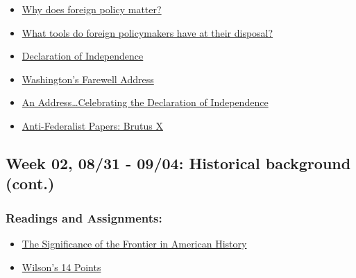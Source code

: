 \documentclass[
  letterpaper,
  DIV=11,
  numbers=noendperiod]{scrartcl}
\providecommand{\tightlist}{%
  \setlength{\itemsep}{0pt}\setlength{\parskip}{0pt}}
\begin{document}
\begin{itemize}
\tightlist
\item
  \href{https://education.cfr.org/learn/video/why-does-us-foreign-policy-matter}{Why
  does foreign policy matter?}
\item
  \href{https://education.cfr.org/learn/learning-journey/tools-foreign-policy/what-tools-do-foreign-policy-makers-have-at-their-disposal}{What
  tools do foreign policymakers have at their disposal?}
\item
  \href{https://www.archives.gov/founding-docs/declaration-transcript}{Declaration
  of Independence}
\item
  \href{https://www.presidency.ucsb.edu/documents/farewell-address}{Washington's
  Farewell Address}
\item
  \href{https://teachingamericanhistory.org/document/speech-on-independence-day/}{An
  Address\ldots Celebrating the Declaration of Independence}
\item
  \href{https://teachingamericanhistory.org/document/brutus-x/}{Anti-Federalist
  Papers: Brutus X}
\end{itemize}

\subsection{Week 02, 08/31 - 09/04: Historical background
(cont.)}\label{week-02-0831---0904-historical-background-cont.}

\subsubsection{Readings and
Assignments:}\label{readings-and-assignments-1}

\begin{itemize}
\tightlist
\item
  \href{https://www.usmcu.edu/Portals/218/Turner\%20Thesis\%2C\%20Frederick\%20Jackson\%20Turner.pdf}{The
  Significance of the Frontier in American History}
\item
  \href{https://www.archives.gov/milestone-documents/president-woodrow-wilsons-14-points}{Wilson's
  14 Points}
\end{itemize}
\end{document}
